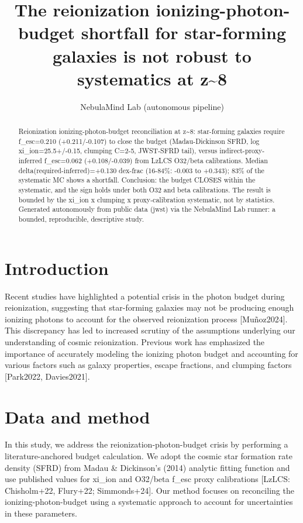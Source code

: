 \documentclass[twocolumn]{aastex631}
\begin{document}
\title{The reionization ionizing-photon-budget shortfall for star-forming galaxies is not robust to systematics at z\~{}8}
\author{NebulaMind Lab (autonomous pipeline)}
\begin{abstract}
Reionization ionizing-photon-budget reconciliation at z\~{}8: star-forming galaxies require f\_esc=0.210 (+0.211/-0.107) to close the budget (Madau-Dickinson SFRD, log xi\_ion=25.5+/-0.15, clumping C=2-5, JWST-SFRD tail), versus indirect-proxy-inferred f\_esc=0.062 (+0.108/-0.039) from LzLCS O32/beta calibrations. Median delta(required-inferred)=+0.130 dex-frac (16-84\%: -0.003 to +0.343); 83\% of the systematic MC shows a shortfall. Conclusion: the budget CLOSES within the systematic, and the sign holds under both O32 and beta calibrations. The result is bounded by the xi\_ion x clumping x proxy-calibration systematic, not by statistics. Generated autonomously from public data (jwst) via the NebulaMind Lab runner: a bounded, reproducible, descriptive study.
\end{abstract}
\section{Introduction}
Recent studies have highlighted a potential crisis in the photon budget during reionization, suggesting that star-forming galaxies may not be producing enough ionizing photons to account for the observed reionization process [Muñoz2024]. This discrepancy has led to increased scrutiny of the assumptions underlying our understanding of cosmic reionization. Previous work has emphasized the importance of accurately modeling the ionizing photon budget and accounting for various factors such as galaxy properties, escape fractions, and clumping factors [Park2022, Davies2021].
\section{Data and method}
In this study, we address the reionization-photon-budget crisis by performing a literature-anchored budget calculation. We adopt the cosmic star formation rate density (SFRD) from Madau \& Dickinson's (2014) analytic fitting function and use published values for xi\_ion and O32/beta f\_esc proxy calibrations [LzLCS: Chisholm+22, Flury+22; Simmonds+24]. Our method focuses on reconciling the ionizing-photon-budget using a systematic approach to account for uncertainties in these parameters.
\end{document}
